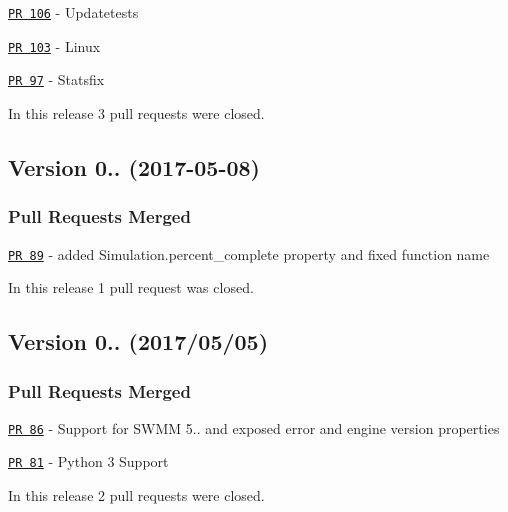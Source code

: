 \begin{DoxyItemize}
\item \href{https://github.com/OpenWaterAnalytics/pyswmm/pull/106}{\tt PR 106} -\/ Updatetests
\item \href{https://github.com/OpenWaterAnalytics/pyswmm/pull/103}{\tt PR 103} -\/ Linux
\item \href{https://github.com/OpenWaterAnalytics/pyswmm/pull/97}{\tt PR 97} -\/ Statsfix
\end{DoxyItemize}

In this release 3 pull requests were closed.

\subsection*{Version 0.. (2017-\/05-\/08)}

\subsubsection*{Pull Requests Merged}


\begin{DoxyItemize}
\item \href{https://github.com/OpenWaterAnalytics/pyswmm/pull/89}{\tt PR 89} -\/ added Simulation.\+percent\+\_\+complete property and fixed function name
\end{DoxyItemize}

In this release 1 pull request was closed.

\subsection*{Version 0.. (2017/05/05)}

\subsubsection*{Pull Requests Merged}


\begin{DoxyItemize}
\item \href{https://github.com/OpenWaterAnalytics/pyswmm/pull/86}{\tt PR 86} -\/ Support for S\+W\+MM 5.. and exposed error and engine version properties
\item \href{https://github.com/OpenWaterAnalytics/pyswmm/pull/81}{\tt PR 81} -\/ Python 3 Support
\end{DoxyItemize}

In this release 2 pull requests were closed.

